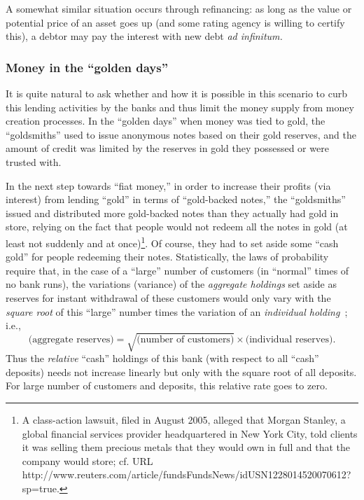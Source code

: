\documentclass[aps,rmp,preprint,amsfonts,showpacs,showkeys]{revtex4}
\begin{document}
A somewhat similar situation occurs through refinancing: as long as the value or potential price
of an asset goes up (and some rating agency is willing to certify this), a debtor may
pay the interest with new debt {\it ad infinitum.}

\subsubsection{Money in the ``golden days''}

It is quite natural to ask
whether and how it is possible in this scenario to curb this lending activities by the banks
and thus limit the money supply from money creation processes.
In the ``golden days'' when money was tied to gold, the ``goldsmiths'' used to issue
anonymous notes based on their gold reserves,
and the amount of credit was limited by the reserves in gold they possessed or were trusted with.

In the next step towards ``fiat money,'' in order to increase their profits (via interest) from lending ``gold'' in terms of ``gold-backed notes,''
the ``goldsmiths'' issued and distributed more gold-backed notes than they actually had gold in store,
relying on the fact that people would not redeem all the notes in gold
(at least not suddenly and at once)\footnote{A class-action lawsuit, filed in August 2005, alleged that Morgan Stanley, a global financial services provider headquartered in New York City,
told clients it was selling them precious metals that they would own in full and that the company would store; cf. URL
http://www.reuters.com/article/fundsFundsNews/idUSN1228014520070612?sp=true.}.
Of course, they had to set aside some ``cash gold'' for people redeeming their notes.
Statistically, the laws of probability require that,
in the case of a ``large'' number of customers (in ``normal'' times of no bank runs),
the variations (variance) of the {\em aggregate holdings} set aside as reserves for instant withdrawal of these customers
would only vary with the {\em square root} of this ``large'' number times  the variation
of an {\em individual holding}~\cite[p.~67]{Wicksell-geld-engl}; i.e.,
$$
\mbox{(aggregate reserves)}
= \sqrt{\mbox{(number of customers)}}
\times
\mbox{(individual reserves)}
.
$$
 Thus the {\em relative} ``cash'' holdings of this bank (with respect to all ``cash'' deposits) needs
not increase linearly but only with the square root of all deposits. For large number of customers and deposits,
this relative rate goes to zero.
\end{document}
